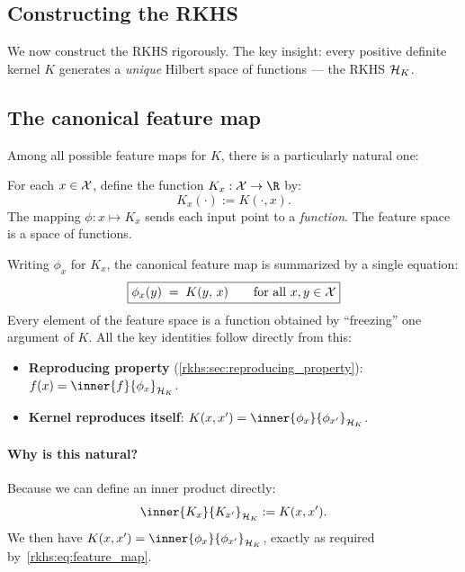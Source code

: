 \begin{notechapter}
\section{Constructing the RKHS}
\label{rkhs:sec:rkhs_construction}

We now construct the RKHS rigorously. The key insight: every positive
definite kernel $K$ generates a \emph{unique} Hilbert space of functions
--- the RKHS $\mathcal{H}_K$.

\subsection{The canonical feature map}
\label{rkhs:subsec:canonical_feature_map}

Among all possible feature maps for $K$, there is a particularly natural one:

\begin{definition}
\label{rkhs:def:canonical_feature}
For each $x \in \mathcal{X}$, define the function
$K_x: \X \to \R$ by:
\[
K_x(\cdot) := K(\cdot, x).
\]
The mapping $\phi: x \mapsto K_x$ sends each input
point to a \emph{function}. The feature space is a
space of functions.
\end{definition}

Writing $\phi_x$ for $K_x$, the canonical feature map
is summarized by a single equation:
\begin{equation}
\label{rkhs:eq:canonical_feature}
\boxed{\phi_x(y) \;=\; K(y,\, x)
  \qquad \text{for all } x, y \in \mathcal{X}}
\end{equation}
Every element of the feature space is a function
obtained by ``freezing'' one argument of $K$. All
the key identities follow directly from this:
\begin{itemize}
  \item \textbf{Reproducing property}
    (\cref{rkhs:sec:reproducing_property}):
    $f(x) = \inner{f}{\phi_x}_{\hk}$.
  \item \textbf{Kernel reproduces itself}:
    $K(x,x') = \inner{\phi_x}{\phi_{x'}}_{\hk}$.
\end{itemize}

\paragraph{Why is this natural?} Because we can define an
inner product directly:
\[
\inner{K_x}{K_{x'}}_{\hk} := K(x, x').
\]
We then have
$K(x,x') = \inner{\phi_x}{\phi_{x'}}_{\hk}$, exactly
as required by~\eqref{rkhs:eq:feature_map}.


\end{notechapter}

